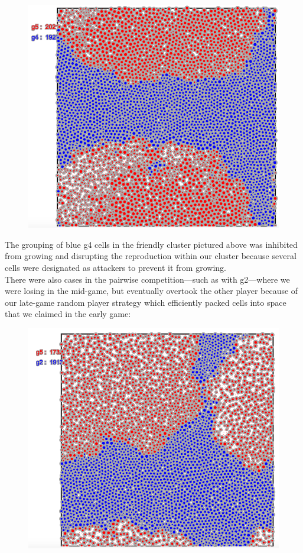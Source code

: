 \begin{figure}[h]
\center
\includegraphics[scale=0.3]{tourn6.png}
\caption{}
\label{fig:tourn6}
\end{figure}




The grouping of blue g4 cells in the friendly cluster pictured above was inhibited from growing and disrupting the reproduction within our cluster because several cells were designated as attackers to prevent it from growing.\\
There were also cases in the pairwise competition—such as with g2—where we were losing in the mid-game, but eventually overtook the other player because of our late-game random player strategy which efficiently packed cells into space that we claimed in the early game:\\
\begin{figure}[h]
\center
\includegraphics[scale=0.3]{tourn7.png}
\caption{}
\label{fig:tourn7}
\end{figure}

